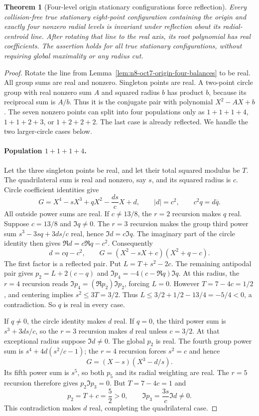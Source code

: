\documentclass[11pt]{article}
\newtheorem{theorem}{Theorem}[section]
\theoremstyle{remark}
\numberwithin{equation}{section}
\begin{document}
\begin{theorem}[Four-level origin stationary configurations force reflection]
\label{thm:n8-oct7-origin-four-reflection}
Every collision-free true stationary eight-point configuration
containing the origin and exactly four nonzero radial levels is
invariant under reflection about its radial-centroid line.
After rotating that line to the real axis, its root polynomial has
real coefficients. The assertion holds for all true stationary
configurations, without requiring global maximality or any radius cut.
\end{theorem}
\begin{proof}
Rotate the line from Lemma~\ref{lem:n8-oct7-origin-four-balances}
to be real. All group sums are real and nonzero. Singleton points
are real. A two-point circle group with real nonzero sum $A$ and
squared radius $b$ has product $b$, because its reciprocal sum is
$A/b$. Thus it is the conjugate pair with polynomial $X^2-AX+b$.
The seven nonzero points can split into four populations only as
$1+1+1+4$, $1+1+2+3$, or $1+2+2+2$. The last case is already
reflected. We handle the two larger-circle cases below.

\paragraph{Population $1+1+1+4$.}
Let the three singleton points be real, and let their total squared
modulus be $T$. The quadrilateral sum is real and nonzero, say $s$,
and its squared radius is $c$. Circle coefficient identities give
\[
 G=X^4-sX^3+qX^2-\frac{ds}{c}X+d,
 \qquad |d|=c^2,\qquad c^2q=d\overline q.
\]
All outside power sums are real. If $c\ne13/8$, the $r=2$ recursion
makes $q$ real. Suppose $c=13/8$ and $\Im q\ne0$.
The $r=3$ recursion makes the group third power sum
$s^3-3sq+3ds/c$ real, hence $\Im d=c\Im q$.
The imaginary part of the circle identity then gives
$\Re d=c\Re q-c^2$. Consequently
\[
 d=cq-c^2,\qquad G=(X^2-sX+c)(X^2+q-c).
\]
The first factor is a reflected pair. Put $L=T+s^2-2c$.
The remaining antipodal pair gives
$p_2=L+2(c-q)$ and $\Im p_4=-4(c-\Re q)\Im q$.
At this radius, the $r=4$ recursion reads
$\Im p_4=(\Re p_2)\Im p_2$, forcing $L=0$.
However $T=7-4c=1/2$, and centering implies $s^2\le3T=3/2$.
Thus $L\le3/2+1/2-13/4=-5/4<0$, a contradiction.
So $q$ is real in every case.

If $q\ne0$, the circle identity makes $d$ real. If $q=0$, the
third power sum is $s^3+3ds/c$, so the $r=3$ recursion makes $d$
real unless $c=3/2$. At that exceptional radius suppose $\Im d\ne0$.
The global $p_2$ is real. The fourth group power sum is
$s^4+4d(s^2/c-1)$; the $r=4$ recursion forces $s^2=c$ and hence
\[
                       G=(X-s)(X^3-d/s).
\]
Its fifth power sum is $s^5$, so both $p_5$ and its radial weighting
are real. The $r=5$ recursion therefore gives $p_2\Im p_3=0$.
But $T=7-4c=1$ and
\[
 p_2=T+c=\frac52>0,\qquad
                  \Im p_3=\frac{3s}{c}\Im d\ne0.
\]
This contradiction makes $d$ real, completing the quadrilateral case.


\end{proof}
\end{document}
